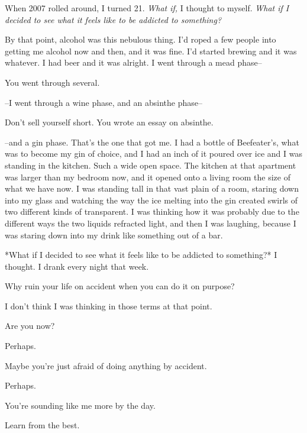 When 2007 rolled around, I turned 21. \emph{What if,} I thought to myself. \emph{What if I decided to see what it feels like to be addicted to something?}

By that point, alcohol was this nebulous thing. I'd roped a few people into getting me alcohol now and then, and it was fine. I'd started brewing and it was whatever. I had beer and it was alright. I went through a mead phase--

\begin{ally}
You went through several.
\end{ally}
--I went through a wine phase, and an absinthe phase--

\begin{ally}
Don't sell yourself short. You wrote an essay on absinthe.
\end{ally}
--and a gin phase. That's the one that got me. I had a bottle of Beefeater's, what was to become my gin of choice, and I had an inch of it poured over ice and I was standing in the kitchen. Such a wide open space. The kitchen at that apartment was larger than my bedroom now, and it opened onto a living room the size of what we have now. I was standing tall in that vast plain of a room, staring down into my glass and watching the way the ice melting into the gin created swirls of two different kinds of transparent. I was thinking how it was probably due to the different ways the two liquids refracted light, and then I was laughing, because I was staring down into my drink like something out of a bar.

*What if I decided to see what it feels like to be addicted to something?* I thought. I drank every night that week.

\begin{ally}
Why ruin your life on accident when you can do it on purpose?
\end{ally}
I don't think I was thinking in those terms at that point.

\begin{ally}
Are you now?
\end{ally}
Perhaps.

\begin{ally}
Maybe you're just afraid of doing anything by accident.
\end{ally}
Perhaps.

\begin{ally}
You're sounding like me more by the day.
\end{ally}
Learn from the best.

